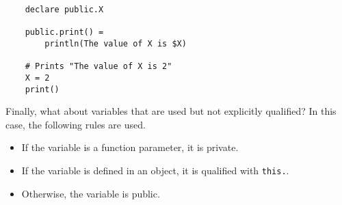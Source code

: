 \begin{verbatim}
    declare public.X

    public.print() =
        println(The value of X is $X)

    # Prints "The value of X is 2"
    X = 2
    print()
\end{verbatim}

Finally, what about variables that are used but not explicitly qualified?  In this case, the following rules are used.

\begin{itemize}
\item If the variable is a function parameter, it is private.
\item If the variable is defined in an object, it is qualified with \verb+this.+.
\item Otherwise, the variable is public.
\end{itemize}

